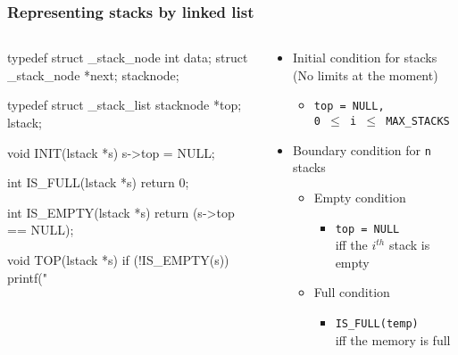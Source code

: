 \documentclass[newPxFont,sthlmFooter,nooffset]{beamer}
\begin{document}
\begin{frame}[t, fragile]
  \frametitle{Representing stacks by linked list}
  \begin{columns}
    \begin{column}{0.5\textwidth}
      \vspace{-1em} 
  \begin{ncodedef}
typedef struct _stack_node {
  int data;
  struct _stack_node *next;
} stacknode;

typedef struct _stack_list {
  stacknode *top;
} lstack;

void INIT(lstack *s) {
  s->top = NULL;
}

int IS_FULL(lstack *s) {
  return 0;
}

int IS_EMPTY(lstack *s) {
  return (s->top == NULL);
}

void TOP(lstack *s) {
  if (!IS_EMPTY(s))
   printf("%
}
\end{ncodedef}      
    \end{column}
    \begin{column}{0.5\textwidth}
      \begin{itemize}
      \item Initial condition for stacks (No limits at the moment)
        \begin{itemize}
        \item \texttt{top = NULL, \\0 $\leq$ i $\leq$ MAX\_STACKS}
        \end{itemize}
      \item Boundary condition for \texttt{n} stacks
        \begin{itemize}
        \item Empty condition
          \begin{itemize}
          \item \texttt{top = NULL} \\iff the $i^{th}$ stack is empty
          \end{itemize}

        \item Full condition
          \begin{itemize}
          \item \texttt{IS\_FULL(temp)} \\iff the memory is full
          \end{itemize}

        \end{itemize}

      \end{itemize}
    \end{column}
  \end{columns}

\end{frame}
\end{document}
